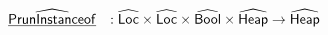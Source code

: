 \[
\begin{array}{ll}
\\\\
\ahf {PrunInstanceof} &:  \aLoc \times \aLoc \times \abs{Bool} \times \aHeap \rightarrow \aHeap\\

\end{array}\]
